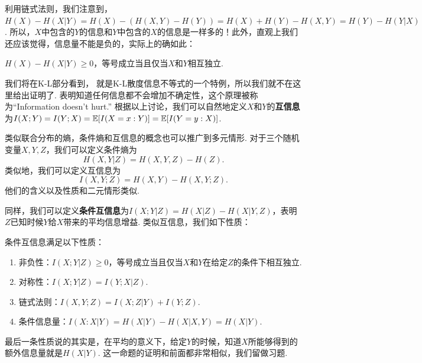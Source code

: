 利用链式法则，我们注意到，$H(X)-H(X|Y)=H(X)-(H(X,Y)-H(Y))=H(X)+H(Y)-H(X,Y)=H(Y)-H(Y|X)$. 所以，$X$中包含的$Y$的信息和$Y$中包含的$X$的信息是一样多的！此外，直观上我们还应该觉得，信息量不能是负的，实际上的确如此：
\begin{proposition}\label{prop:information-doesnt-hurt}
    $H(X)-H(X|Y)\geq 0$，等号成立当且仅当$X$和$Y$相互独立.
\end{proposition}

我们将在K-L部分看到， 就是K-L散度信息不等式的一个特例，所以我们就不在这里给出证明了.  表明知道任何信息都不会增加不确定性，这个原理被称为“Information doesn't hurt.” 根据以上讨论，我们可以自然地定义$X$和$Y$的\textbf{互信息}为$I(X;Y)=I(Y;X)=\mathbb{E}[I(X=x:Y)]=\mathbb{E}[I(Y=y:X)]$.

类似联合分布的熵，条件熵和互信息的概念也可以推广到多元情形. 对于三个随机变量$X,Y,Z$，我们可以定义条件熵为
\[H(X,Y|Z)=H(X,Y,Z)-H(Z).\]
类似地，我们可以定义互信息为
\[I(X,Y;Z)=H(X,Y)-H(X,Y;Z).\]
他们的含义以及性质和二元情形类似.

同样，我们可以定义\textbf{条件互信息}为$I(X;Y|Z)=H(X|Z)-H(X|Y,Z)$，表明$Z$已知时候$Y$给$X$带来的平均信息增益. 类似互信息，我们如下性质：
\begin{proposition}\label{prop:conditional-mutual-information}
    条件互信息满足以下性质：
    \begin{enumerate}
        \item 非负性：$I(X;Y|Z)\geq 0$，等号成立当且仅当$X$和$Y$在给定$Z$的条件下相互独立.
        \item 对称性：$I(X;Y|Z)=I(Y;X|Z)$.
        \item 链式法则：$I(X,Y;Z)=I(X;Z|Y)+I(Y;Z)$.
        \item 条件信息量：$I(X:X|Y)=H(X|Y)-H(X|X,Y)=H(X|Y)$.
    \end{enumerate}
\end{proposition}
最后一条性质说的其实是，在平均的意义下，给定$Y$的时候，知道$X$所能够得到的额外信息量就是$H(X|Y)$. 这一命题的证明和前面都非常相似，我们留做习题.

